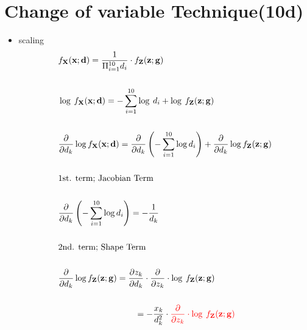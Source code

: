 \documentclass[12pt,a4paper, fleqn]{article}
\begin{document}
\section{Change of variable Technique(10d)}
\begin{itemize}
    \item scaling
    \begin{equation}
        \begin{aligned}
        &f_{\mathbf{X}}(\mathbf{x};\mathbf{d}) = \frac{1}{\Pi_{i=1}^{10}d_i}\cdot f_{\mathbf{Z}}(\mathbf{z};\mathbf{g}) \\
        \\
        &\log\:f_{\mathbf{X}}(\mathbf{x};\mathbf{d})=-\sum_{i=1}^{10} \log\:d_i + \log\:f_{\mathbf{Z}}(\mathbf{z};\mathbf{g}) \\
        \\
        &\frac{\partial}{\partial d_{k}} \log f_{\mathbf{X}}(\mathbf{x};\mathbf{d}) = \frac{\partial}{\partial d_{k}} \left( -\sum_{i=1}^{10} \log d_i \right) + \frac{\partial}{\partial d_{k}} \log f_{\mathbf{Z}}(\mathbf{z};\mathbf{g})\\
        \\
        &\text{1st. term; Jacobian Term}\\
        \\
        &\frac{\partial}{\partial d_{k}} \left( -\sum_{i=1}^{10}\log d_i \right) = -\frac{1}{d_{k}}\\
        \\
        &\text{2nd. term; Shape Term}\\
        \\
        &\frac{\partial}{\partial d_{k}} \log f_{\mathbf{Z}}(\mathbf{z};\mathbf{g}) = \frac{\partial z_k}{\partial {d_k}}\cdot\frac{\partial}{\partial z_k}\cdot\log\:f_\mathbf{Z}(\mathbf{z};\mathbf{g})\\
        \\
        & \hspace{90pt}=-\frac{x_k}{d_k^2}\cdot\textcolor{red}{\frac{\partial}{\partial z_k}\cdot\log\:f_\mathbf{Z}(\mathbf{z};\mathbf{g})}\\
        \\
        \end{aligned}
        \nonumber
    \end{equation}
    

\end{itemize}
\end{document}

